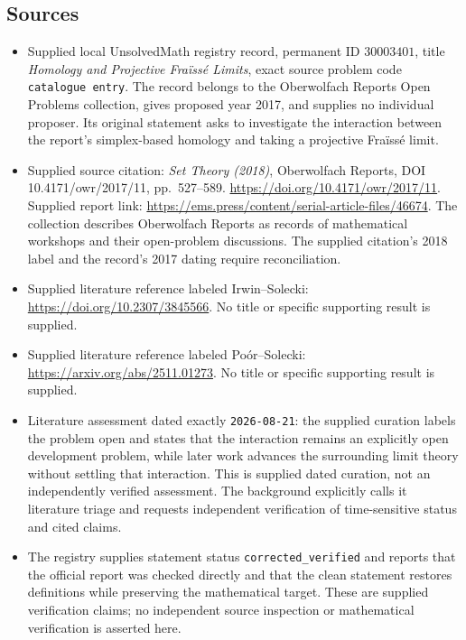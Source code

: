 \documentclass[11pt]{article}
\begin{document}
\subsection{Sources}
\begin{itemize}
\item Supplied local UnsolvedMath registry record, permanent ID \(30003401\), title \emph{Homology and Projective Fra\"iss\'e Limits}, exact source problem code \texttt{catalogue entry}. The record belongs to the Oberwolfach Reports Open Problems collection, gives proposed year 2017, and supplies no individual proposer. Its original statement asks to investigate the interaction between the report's simplex-based homology and taking a projective Fra\"iss\'e limit.
\item Supplied source citation: \emph{Set Theory (2018)}, Oberwolfach Reports, DOI 10.4171/owr/2017/11, pp.\ 527--589. \url{https://doi.org/10.4171/owr/2017/11}. Supplied report link: \url{https://ems.press/content/serial-article-files/46674}. The collection describes Oberwolfach Reports as records of mathematical workshops and their open-problem discussions. The supplied citation's 2018 label and the record's 2017 dating require reconciliation.
\item Supplied literature reference labeled Irwin--Solecki: \url{https://doi.org/10.2307/3845566}. No title or specific supporting result is supplied.
\item Supplied literature reference labeled Po\'or--Solecki: \url{https://arxiv.org/abs/2511.01273}. No title or specific supporting result is supplied.
\item Literature assessment dated exactly \texttt{2026-08-21}: the supplied curation labels the problem open and states that the interaction remains an explicitly open development problem, while later work advances the surrounding limit theory without settling that interaction. This is supplied dated curation, not an independently verified assessment. The background explicitly calls it literature triage and requests independent verification of time-sensitive status and cited claims.
\item The registry supplies statement status \texttt{corrected\_verified} and reports that the official report was checked directly and that the clean statement restores definitions while preserving the mathematical target. These are supplied verification claims; no independent source inspection or mathematical verification is asserted here.
\end{itemize}
\end{document}
